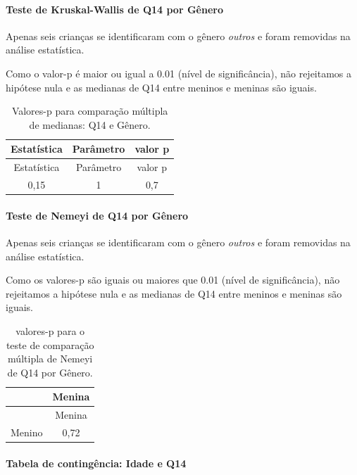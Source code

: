 \documentclass[]{article}
\let\oldparagraph\paragraph
\renewcommand{\paragraph}[1]{\oldparagraph{#1}\mbox{}}
\begin{document}
\hypertarget{teste-de-kruskal-wallis-de-q14-por-guxeanero}{%
\paragraph{Teste de Kruskal-Wallis de Q14 por Gênero}\label{teste-de-kruskal-wallis-de-q14-por-guxeanero}}

Apenas seis crianças se identificaram com o gênero \emph{outros} e foram removidas na análise estatística.

Como o valor-p é maior ou igual a 0.01 (nível de significância), não rejeitamos a hipótese nula e as medianas de Q14 entre meninos e meninas são iguais.

\begin{longtable}[]{@{}ccc@{}}
\caption{\label{tab:unnamed-chunk-30}Valores-p para comparação múltipla de medianas: Q14 e Gênero.}\tabularnewline
\toprule
Estatística & Parâmetro & valor p\tabularnewline
\midrule
\endfirsthead
\toprule
Estatística & Parâmetro & valor p\tabularnewline
\midrule
\endhead
0,15 & 1 & 0,7\tabularnewline
\bottomrule
\end{longtable}

\hypertarget{teste-de-nemeyi-de-q14-por-guxeanero}{%
\paragraph{Teste de Nemeyi de Q14 por Gênero}\label{teste-de-nemeyi-de-q14-por-guxeanero}}

Apenas seis crianças se identificaram com o gênero \emph{outros} e foram removidas na análise estatística.

Como os valores-p são iguais ou maiores que 0.01 (nível de significância), não rejeitamos a hipótese nula e as medianas de Q14 entre meninos e meninas são iguais.

\begin{longtable}[]{@{}lc@{}}
\caption{\label{tab:unnamed-chunk-32}valores-p para o teste de comparação múltipla de Nemeyi de Q14 por Gênero.}\tabularnewline
\toprule
& Menina\tabularnewline
\midrule
\endfirsthead
\toprule
& Menina\tabularnewline
\midrule
\endhead
Menino & 0,72\tabularnewline
\bottomrule
\end{longtable}

\cleardoublepage

\hypertarget{tabela-de-continguxeancia-idade-e-q14}{%
\paragraph{Tabela de contingência: Idade e Q14}\label{tabela-de-continguxeancia-idade-e-q14}}
\end{document}

